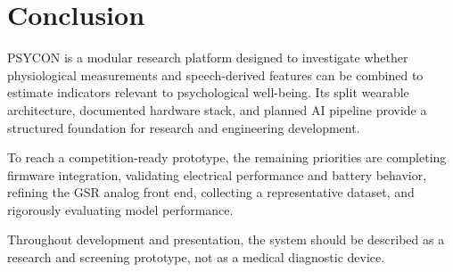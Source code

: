 \section{Conclusion}
\label{sec:conclusion}

PSYCON is a modular research platform designed to investigate whether physiological measurements and speech-derived features can be combined to estimate indicators relevant to psychological well-being. Its split wearable architecture, documented hardware stack, and planned AI pipeline provide a structured foundation for research and engineering development.

To reach a competition-ready prototype, the remaining priorities are completing firmware integration, validating electrical performance and battery behavior, refining the GSR analog front end, collecting a representative dataset, and rigorously evaluating model performance.

\begin{warningbox}
Throughout development and presentation, the system should be described as a research and screening prototype, not as a medical diagnostic device.
\end{warningbox}
